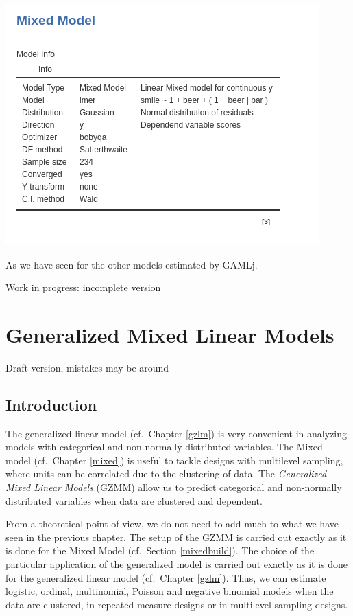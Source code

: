 \documentclass[
]{book}
\begin{document}
\includegraphics[width=0.7\linewidth]{bookletpics/4_simple_output1}

As we have seen for the other models estimated by {GAMLj}.

{ Work in progress: incomplete version }

\hypertarget{gmixed}{%
\chapter{Generalized Mixed Linear Models}\label{gmixed}}

{ Draft version, mistakes may be around }

\hypertarget{introduction-2}{%
\section{Introduction}\label{introduction-2}}

The generalized linear model (cf.~Chapter \ref{gzlm}) is very convenient in analyzing models with categorical and non-normally distributed variables. The Mixed model (cf.~Chapter \ref{mixed}) is useful to tackle designs with multilevel sampling, where units can be correlated due to the clustering of data. The \emph{Generalized Mixed Linear Models} (GZMM) allow us to predict categorical and non-normally distributed variables when data are clustered and dependent.

From a theoretical point of view, we do not need to add much to what we have seen in the previous chapter. The setup of the GZMM is carried out exactly as it is done for the Mixed Model (cf.~Section \ref{mixedbuild}). The choice of the particular application of the generalized model is carried out exactly as it is done for the generalized linear model (cf.~Chapter \ref{gzlm}). Thus, we can estimate logistic, ordinal, multinomial, Poisson and negative binomial models when the data are clustered, in repeated-measure designs or in multilevel sampling designs.
\end{document}
